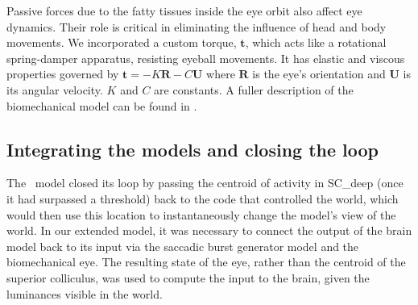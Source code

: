 \documentclass{frontiersSCNS}
\begin{document}
Passive forces due to the fatty tissues inside the eye orbit also
affect eye dynamics. Their role is critical in eliminating the
influence of head and body movements. We incorporated a custom torque, $\mathbf{t}$,
which acts like a rotational spring-damper apparatus, resisting
eyeball movements. It has elastic and viscous properties governed by
$\mathbf{t} = -K\mathbf{R}-C\mathbf{U}$ where $\mathbf{R}$ is the
eye's orientation and $\mathbf{U}$ is its angular velocity. $K$ and
$C$ are constants. A fuller description of the biomechanical model
can be found in \cite{papapavlou_physics-based_2014}.

\subsection{Integrating the models and closing the loop}

The \ccg~model closed its loop by passing the centroid of activity in
SC\_deep (once it had surpassed a threshold) back to the code that
controlled the world, which would then use this location to
instantaneously change the model's view of the world. In our extended
model, it was necessary to connect the output of the brain model back
to its input via the saccadic burst generator model and the
biomechanical eye. The resulting state of the eye, rather than the
centroid of the superior colliculus, was used to compute the input to
the brain, given the luminances visible in the world.
\end{document}
